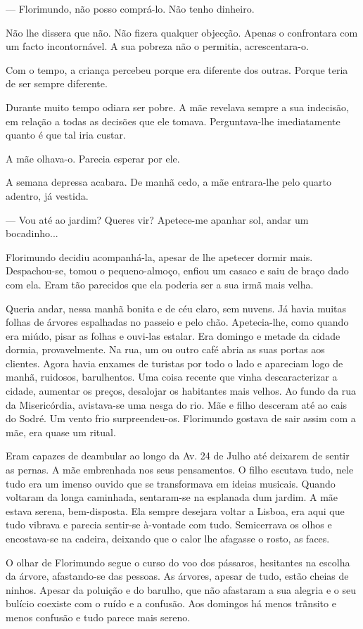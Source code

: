 --- Florimundo, não posso comprá-lo. Não tenho dinheiro.

Não lhe dissera que não. Não fizera qualquer objecção. Apenas o
confrontara com um facto incontornável. A sua pobreza não o permitia,
acrescentara-o.

Com o tempo, a criança percebeu porque era diferente dos outras. Porque
teria de ser sempre diferente.

Durante muito tempo odiara ser pobre. A mãe revelava sempre a sua
indecisão, em relação a todas as decisões que ele tomava. Perguntava-lhe
imediatamente quanto é que tal iria custar.

A mãe olhava-o. Parecia esperar por ele.

A semana depressa acabara. De manhã cedo, a mãe entrara-lhe pelo quarto
adentro, já vestida.

--- Vou até ao jardim? Queres vir? Apetece-me apanhar sol, andar um
bocadinho...

Florimundo decidiu acompanhá-la, apesar de lhe apetecer dormir mais.
Despachou-se, tomou o pequeno-almoço, enfiou um casaco e saiu de braço
dado com ela. Eram tão parecidos que ela poderia ser a sua irmã mais
velha.

Queria andar, nessa manhã bonita e de céu claro, sem nuvens. Já havia
muitas folhas de árvores espalhadas no passeio e pelo chão.
Apetecia-lhe, como quando era miúdo, pisar as folhas e ouvi-las estalar.
Era domingo e metade da cidade dormia, provavelmente. Na rua, um ou
outro café abria as suas portas aos clientes. Agora havia enxames de
turistas por todo o lado e apareciam logo de manhã, ruidosos,
barulhentos. Uma coisa recente que vinha descaracterizar a cidade,
aumentar os preços, desalojar os habitantes mais velhos. Ao fundo da rua
da Misericórdia, avistava-se uma nesga do rio. Mãe e filho desceram até
ao cais do Sodré. Um vento frio surpreendeu-os. Florimundo gostava de
sair assim com a mãe, era quase um ritual.

Eram capazes de deambular ao longo da Av. 24 de Julho até deixarem de
sentir as pernas. A mãe embrenhada nos seus pensamentos. O filho
escutava tudo, nele tudo era um imenso ouvido que se transformava em
ideias musicais. Quando voltaram da longa caminhada, sentaram-se na
esplanada dum jardim. A mãe estava serena, bem-disposta. Ela sempre
desejara voltar a Lisboa, era aqui que tudo vibrava e parecia sentir-se
à-vontade com tudo. Semicerrava os olhos e encostava-se na cadeira,
deixando que o calor lhe afagasse o rosto, as faces.

O olhar de Florimundo segue o curso do voo dos pássaros, hesitantes na
escolha da árvore, afastando-se das pessoas. As árvores, apesar de tudo,
estão cheias de ninhos. Apesar da poluição e do barulho, que não
afastaram a sua alegria e o seu bulício coexiste com o ruído e a
confusão. Aos domingos há menos trânsito e menos confusão e tudo parece
mais sereno.

